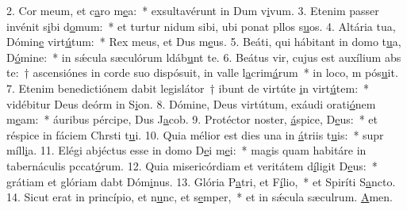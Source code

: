 2. Cor meum, et c\uline{a}ro m\uline{e}a:~* exsultavérunt in Dum v\uline{i}vum.
3. Etenim passer invénit s\uline{i}bi d\uline{o}mum:~* et turtur nidum sibi, ubi ponat pllos s\uline{u}os.
4. Altária tua, Dómin\uline{e} virt\uline{ú}tum:~* Rex meus, et Dus m\uline{e}us.
5. Beáti, qui hábitant in domo t\uline{u}a, D\uline{ó}mine:~* in sǽcula sæculórum ldáb\uline{u}nt te.
6. Beátus vir, cujus est auxílium abs te:~† ascensiónes in corde suo dispósuit, in valle l\uline{a}crim\uline{á}rum~* in loco, m pós\uline{u}it.
7. Etenim benedictiónem dabit legislátor~† ibunt de virtúte \uline{i}n virt\uline{ú}tem:~* vidébitur Deus deórm in S\uline{i}on.
8. Dómine, Deus virtútum, exáudi orati\uline{ó}nem m\uline{e}am:~* áuribus pércipe, Dus J\uline{a}cob.
9. Protéctor noster, \uline{á}spice, D\uline{e}us:~* et réspice in fáciem Chrsti t\uline{u}i.
10. Quia mélior est dies una in \uline{á}triis t\uline{u}is:~* supr míll\uline{i}a.
11. Elégi abjéctus esse in domo D\uline{e}i m\uline{e}i:~* magis quam habitáre in tabernáculis pccat\uline{ó}rum.
12. Quia misericórdiam et veritátem d\uline{í}ligit D\uline{e}us:~* grátiam et glóriam dabt Dóm\uline{i}nus.
13. Glória P\uline{a}tri, et F\uline{í}lio,~* et Spiríti S\uline{a}ncto.
14. Sicut erat in princípio, et n\uline{u}nc, et s\uline{e}mper,~* et in sǽcula sæculrum. \uline{A}men.
